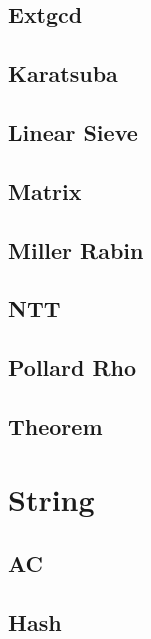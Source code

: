 \documentclass[a4paper,10pt,twocolumn,oneside]{article}
\begin{document}
\subsection{Extgcd}


\subsection{Karatsuba}


\subsection{Linear Sieve}


\subsection{Matrix}


\subsection{Miller Rabin}


\subsection{NTT}


\subsection{Pollard Rho}


\subsection{Theorem}


\section{String}
\subsection{AC}

\subsection{Hash}

\end{document}
